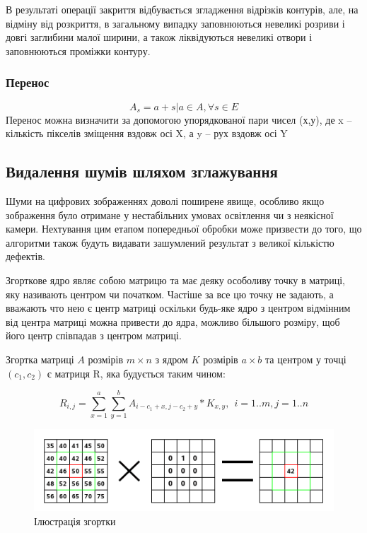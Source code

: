 	
	В результаті операції закриття відбувається згладження відрізків контурів, але, на відміну від розкриття, в загальному випадку заповнюються невеликі розриви і довгі заглибини малої ширини, а також ліквідуються невеликі отвори і заповнюються проміжки контуру.
	
\subsubsection{Перенос}
	\begin{equation}
	A_{s} = { a + s | a \in A}, \forall s \in E
	\end{equation}
	Перенос можна визначити за допомогою упорядкованої пари чисел (х,у), де x – кількість пікселів зміщення вздовж осі X, а y – рух вздовж осі Y


\subsection{Видалення шумів шляхом зглажування}

Шуми на цифрових зображеннях доволі поширене явище, особливо якщо зображення було отримане у нестабільних умовах освітлення чи з неякісної камери. Нехтування цим етапом попередньої обробки може призвести до того, що алгоритми також будуть видавати зашумлений результат з великої кількістю дефектів.

Згорткове ядро являє собою матрицю та має деяку особоливу точку в матриці, яку називають центром чи початком. Частіше за все цю точку не задають, а вважають что нею є центр матриці оскільки будь-яке ядро з центром відмінним від центра матриці можна привести до ядра, можливо більшого розміру, щоб його центр співпадав з центром матриці.

Згортка матриці $A$ розмірів $m \times n$ з ядром $K$ розмірів $a \times b$ та центром у точці $(c_{1},c_{2})$ є матриця R, яка будується таким чином:

\begin{equation}
	R_{i,j} = \sum_{x = 1}^{a} \sum_{y = 1}^{b} A_{i-c_{1}+x,j-c_{2}+y}*K_{x,y},
	\:\: i=1..m,j=1..n
	\label{eq:convolution}
\end{equation}

\begin{figure}[H]
	\centering
	\includegraphics[width=0.7\linewidth]{theory/img/simple_convolution_example}
	\caption{Ілюстрація згортки}
	\label{fig:simple_convolution_example}
\end{figure}

